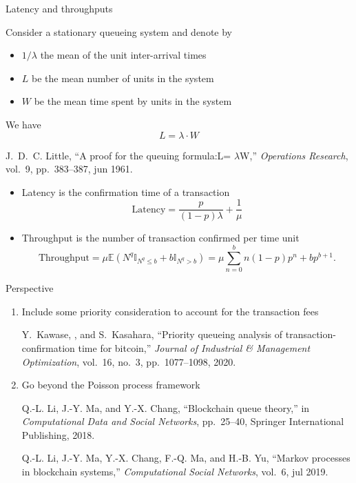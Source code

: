 \documentclass{beamer}
\begin{document}
\begin{frame}{Latency and throughputs}
\scriptsize
\begin{tcolorbox}[enhanced,drop shadow, title=Little's law]
Consider a stationary queueing system and denote by 
\begin{itemize}
  \item $1/\lambda$ the mean of the unit inter-arrival times
  \item $L$ be the mean number of units in the system
  \item $W$ be the mean time spent by units in the system
\end{itemize}
We have
$$
L = \lambda \cdot W
$$
\end{tcolorbox}
\tiny
\begin{thebibliography}{1}

J.~D.~C. Little, ``A proof for the queuing formula:{L}= $\lambda${W},'' {\em
  Operations Research}, vol.~9, pp.~383--387, jun 1961.

\end{thebibliography}
\scriptsize
\begin{itemize}
  \item Latency is the confirmation time of a transaction 
    $$
    \text{Latency} = \frac{p}{(1-p)\lambda} + \frac{1}{\mu}
    $$
  \item Throughput is the number of transaction confirmed per time unit
  $$
    \text{Throughput} = \mu\mathbb{E}(N^q\mathbb{I}_{N^q\leq b}+b\mathbb{I}_{N^q> b}) = \mu\sum_{n = 0}^bn(1-p)p^n + bp^{b+1}.
  $$
\end{itemize}
\end{frame}
\begin{frame}{Perspective}
\begin{enumerate}
  \item  Include some priority consideration to account for the transaction fees 
  \tiny 
  \begin{thebibliography}{1}

Y.~Kawase, , and S.~Kasahara, ``Priority queueing analysis of
  transaction-confirmation time for bitcoin,'' {\em Journal of Industrial {\&}
  Management Optimization}, vol.~16, no.~3, pp.~1077--1098, 2020.

\end{thebibliography}

  \item \normalsize Go beyond the Poisson process framework
  \tiny
  \begin{thebibliography}{1}

Q.-L. Li, J.-Y. Ma, and Y.-X. Chang, ``Blockchain queue theory,'' in {\em
  Computational Data and Social Networks}, pp.~25--40, Springer International
  Publishing, 2018.

Q.-L. Li, J.-Y. Ma, Y.-X. Chang, F.-Q. Ma, and H.-B. Yu, ``Markov processes in
  blockchain systems,'' {\em Computational Social Networks}, vol.~6, jul 2019.

\end{thebibliography}
\end{enumerate}

\end{frame}
\end{document}
